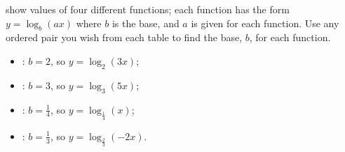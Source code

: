 \begin{exercises}
\begin{problem}\label{log:prob:findbasetabs}
 show values of four 
different functions; each function has the form $y=\log_b(ax)$ where
$b$ is the base, and $a$ is given for each function. 
Use any ordered pair you wish from each table to find the base, $b$, 
for each function.
\begin{shortsolution}
	\begin{itemize}
		\item {}: $b=2$, so $y=\log_2(3x)$;
		\item {}: $b=3$, so $y=\log_3(5x)$;
		\item {}: $b=\frac{1}{4}$, so $y=\log_{\frac{1}{4}}(x)$;
		\item {}: $b=\frac{1}{3}$, so $y=\log_{\frac{2}{3}}(-2x)$.
	\end{itemize}
\end{shortsolution}


\end{problem}
\end{exercises}
